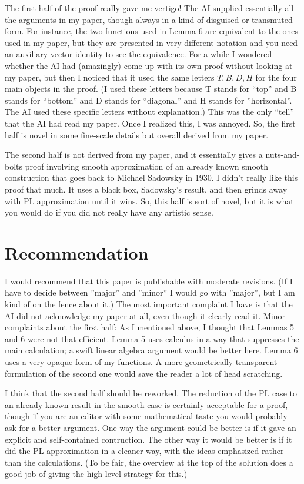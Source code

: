 \documentclass[12pt]{article}
\theoremstyle{plain}
\begin{document}
The first half of the proof really gave me vertigo!  The AI supplied essentially all the arguments in my paper, though always in a kind of disguised or transmuted form.  For instance, the two functions used in Lemma 6 are equivalent to the ones used in my paper, but they are presented in very different notation and you need an auxiliary vector identity to see the equivalence.  For a while I wondered whether the AI had (amazingly) come up with its own proof without looking at my paper, but then I noticed that it used the same letters $T,B,D,H$ for the four main objects in the proof.  (I used these letters because T stands for ``top'' and B stands for ``bottom'' and D stands for ``diagonal'' and H stands for ''horizontal''.  The AI used these specific letters without explanation.)  This was the only ``tell'' that the AI had read my paper.  Once I realized this, I was annoyed.
So, the first half is novel in some fine-scale details but overall derived from my paper.


The second half is not derived from my paper, and it essentially gives a nuts-and-bolts proof involving smooth approximation of an already known smooth construction that goes back to Michael Sadowsky in 1930.  I didn't really like this proof that much. It uses a black box, Sadowsky's result, and then grinds away with PL approximation until it wins.  So, this half is sort of novel, but it is what you would do if you did not really have any artistic sense.


\section{Recommendation}

I would recommend that this paper is publishable with moderate revisions. (If I have to decide between ''major'' and ''minor'' I would go with ''major'', but I am kind of on the fence about it.)
The most important complaint I have is that the AI did not acknowledge my paper at all, even though it clearly read it.  Minor complaints about the first half: As I mentioned above, I thought that Lemmas 5 and 6 were not that efficient. Lemma 5 uses calculus in a way that suppresses the main calculation;  a swift linear algebra argument would be better here.  Lemma 6 uses a very opaque form of my functions.  A more geometrically transparent formulation of the second one would save the reader a lot of head scratching.

I think that the second half should be reworked.  The reduction of the PL case to an already known result in the smooth case is certainly acceptable for a proof, though if you are an editor with some mathematical taste you would probably ask for a better argument.  One way the argument could be better is if it gave an explicit and self-contained contruction.  The other way it would be better is if it did the PL approximation in a cleaner way, with the ideas emphasized rather than the calculations. (To be fair, the overview at the top of the solution does a good job of giving the high level strategy for this.)
\end{document}
